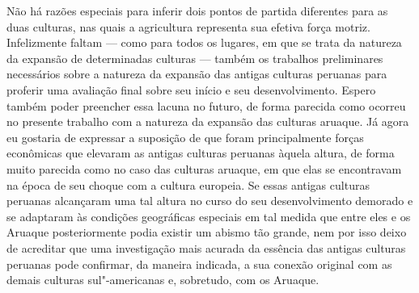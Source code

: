 Não há razões especiais para inferir dois pontos de partida diferentes
para as duas culturas, nas quais a agricultura representa sua efetiva
força motriz. Infelizmente faltam --- como para todos os lugares, em que
se trata da natureza da expansão de determinadas culturas --- também os
trabalhos preliminares necessários sobre a natureza da expansão das
antigas culturas peruanas para proferir uma avaliação final sobre seu
início e seu desenvolvimento. Espero também poder preencher essa lacuna
no futuro, de forma parecida como ocorreu no presente trabalho com a
natureza da expansão das culturas aruaque. Já agora eu gostaria de
expressar a suposição de que foram principalmente forças econômicas que
elevaram as antigas culturas peruanas àquela altura, de forma muito
parecida como no caso das culturas aruaque, em que elas se encontravam
na época de seu choque com a cultura europeia. Se essas antigas culturas
peruanas alcançaram uma tal altura no curso do seu desenvolvimento
demorado e se adaptaram às condições geográficas especiais em tal medida
que entre eles e os Aruaque posteriormente podia existir um abismo tão
grande, nem por isso deixo de acreditar que uma investigação mais
acurada da essência das antigas culturas peruanas pode confirmar, da
maneira indicada, a sua conexão original com as demais culturas
sul"-americanas e, sobretudo, com os Aruaque.

